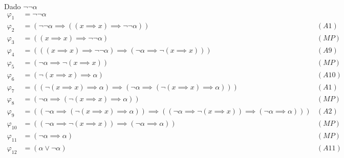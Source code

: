 \begin{sol}
    Dado $\neg\neg\alpha$
    \begin{align*}
        \varphi_1    & = \neg\neg\alpha                                                                                                                                   \\
        \varphi_2    & = (\neg\neg\alpha\implies((x\implies x)\implies \neg\neg\alpha))                                                                           & (A1)  \\
        \varphi_3    & = ((x\implies x)\implies\neg\neg\alpha)                                                                                                    & (MP)  \\
        \varphi_4    & = (((x\implies x)\implies\neg\neg\alpha)\implies(\neg\alpha\implies\neg(x\implies x)))                                                     & (A9)  \\
        \varphi_5    & = (\neg\alpha\implies\neg(x\implies x))                                                                                                    & (MP)  \\
        \varphi_6    & = (\neg(x\implies x)\implies\alpha)                                                                                                        & (A10) \\
        \varphi_7    & = ((\neg(x\implies x)\implies\alpha)\implies(\neg\alpha\implies(\neg(x\implies x)\implies\alpha)))                                         & (A1)  \\
        \varphi_8    & = (\neg\alpha\implies(\neg(x\implies x)\implies\alpha))                                                                                    & (MP)  \\
        \varphi_9    & = ((\neg\alpha\implies(\neg(x\implies x)\implies\alpha))\implies((\neg\alpha\implies\neg(x\implies x))\implies(\neg\alpha\implies\alpha))) & (A2)  \\
        \varphi_{10} & = ((\neg\alpha\implies\neg(x\implies x))\implies(\neg\alpha\implies\alpha))                                                                & (MP)  \\
        \varphi_{11} & = (\neg\alpha\implies\alpha)                                                                                                               & (MP)  \\
        \varphi_{12} & = (\alpha\vee\neg\alpha)                                                                                                                   & (A11) \\

\end{align*}
\end{sol}
